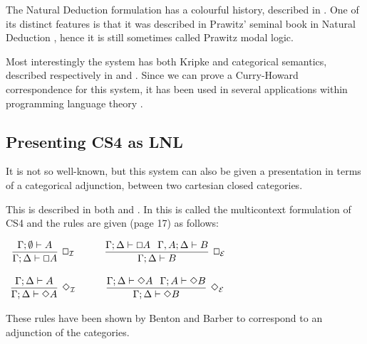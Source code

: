 \documentclass{article}
\renewcommand{\Box}{\oblong}
\begin{document}
The Natural Deduction formulation has a colourful history, described
in \cite{CS4}. One of its distinct features is that it was described
in Prawitz' seminal book in Natural Deduction \cite{prawitz1965},
hence it is still sometimes called Prawitz modal logic.

Most interestingly the system has both Kripke and categorical
semantics, described respectively in \cite{alechinaetal} and
\cite{CS4}. Since we can prove a Curry-Howard correspondence for this
system, it has been used in several applications within programming
language theory .

\subsection{Presenting CS4 as LNL}
It is not so well-known, but this system can also be given a
presentation in terms of a categorical adjunction, between two
cartesian closed categories.

This is described in both \cite{CS4} and \cite{icalp1998}. In
\cite{CS4} this is called the multicontext formulation of CS4 and the
rules are given (page 17) as follows:

\begin{center}
  \begin{math}
    \begin{array}{ccccc}              
      \infer[\Box_{\mathcal{I}}]{\Gamma; \Delta \vdash \Box A}{
        \Gamma;\emptyset \vdash  A
      }
      & \quad &
      \infer[\Box_{\mathcal{E}}]{\Gamma;\Delta \vdash B}{\Gamma; \Delta \vdash \Box A \hspace{.1in}
        \Gamma, A;\Delta \vdash B
      }\\\\
      \infer[\Diamond_{\mathcal{I}}]{\Gamma;\Delta \vdash \Diamond A}{
        \Gamma;\Delta \vdash A
      }
      & \quad &
      \infer[\Diamond_{\mathcal{E}}]{\Gamma;\Delta \vdash \Diamond B}{
        \Gamma ;\Delta \vdash \Diamond A \hspace{.1in}\Gamma; A\vdash \Diamond B
      }
    \end{array}        
  \end{math}
\end{center}

These rules have been shown by Benton \cite{benton1995} and Barber to
correspond to an adjunction of the categories.  
\end{document}
